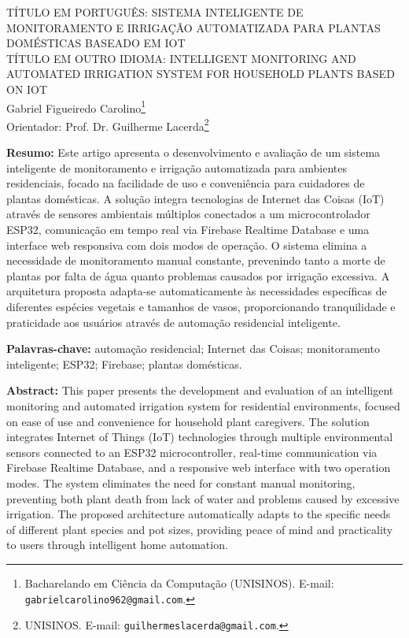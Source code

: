 \documentclass[oneside,english,brazilian]{UNISINOSmonografia}
\begin{document}
\capa
\folhaderosto
\tableofcontents
\clearpage
\thispagestyle{plain}
\begin{center}
\MakeUppercase{TÍTULO EM PORTUGUÊS: Sistema Inteligente de Monitoramento e Irrigação Automatizada para Plantas Domésticas baseado em IoT}\\[0.75em]
\MakeUppercase{TÍTULO EM OUTRO IDIOMA: Intelligent Monitoring and Automated Irrigation System for Household Plants based on IoT}\\[1.5em]

Gabriel Figueiredo Carolino\footnote{Bacharelando em Ciência da Computação (UNISINOS). E-mail: \texttt{gabrielcarolino962@gmail.com}.} \\
Orientador: Prof. Dr. Guilherme Lacerda\footnote{UNISINOS. E-mail: \texttt{guilhermeslacerda@gmail.com}.}
\end{center}

\bigskip

\noindent\textbf{Resumo:} Este artigo apresenta o desenvolvimento e avaliação de um sistema inteligente de monitoramento e irrigação automatizada para ambientes residenciais, focado na facilidade de uso e conveniência para cuidadores de plantas domésticas. A solução integra tecnologias de Internet das Coisas (IoT) através de sensores ambientais múltiplos conectados a um microcontrolador ESP32, comunicação em tempo real via Firebase Realtime Database e uma interface web responsiva com dois modos de operação. O sistema elimina a necessidade de monitoramento manual constante, prevenindo tanto a morte de plantas por falta de água quanto problemas causados por irrigação excessiva. A arquitetura proposta adapta-se automaticamente às necessidades específicas de diferentes espécies vegetais e tamanhos de vasos, proporcionando tranquilidade e praticidade aos usuários através de automação residencial inteligente.

\medskip
\noindent\textbf{Palavras-chave:} automação residencial; Internet das Coisas; monitoramento inteligente; ESP32; Firebase; plantas domésticas.

\medskip
\noindent\textbf{Abstract:} This paper presents the development and evaluation of an intelligent monitoring and automated irrigation system for residential environments, focused on ease of use and convenience for household plant caregivers. The solution integrates Internet of Things (IoT) technologies through multiple environmental sensors connected to an ESP32 microcontroller, real-time communication via Firebase Realtime Database, and a responsive web interface with two operation modes. The system eliminates the need for constant manual monitoring, preventing both plant death from lack of water and problems caused by excessive irrigation. The proposed architecture automatically adapts to the specific needs of different plant species and pot sizes, providing peace of mind and practicality to users through intelligent home automation.
\end{document}
